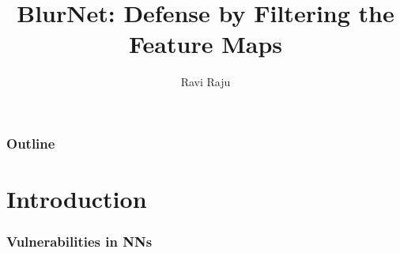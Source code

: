 \documentclass{beamer}
\title{BlurNet: Defense by Filtering the Feature Maps}
\subtitle{Ravi Raju}
\begin{document}
\begin{frame}
	\titlepage
\end{frame}

\begin{frame}
\frametitle{Outline}
\tableofcontents
\end{frame}

\section{Introduction} %
\begin{frame}
\frametitle{Vulnerabilities in NNs}	
% 
\end{frame}
	
\end{document}
